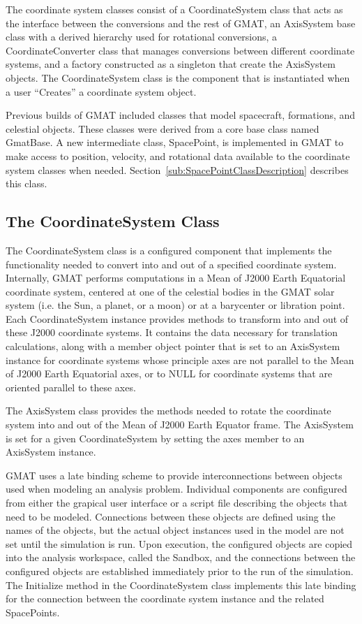 The coordinate system classes consist of a CoordinateSystem class that acts as the interface between
the conversions and the rest of GMAT, an AxisSystem base class with a derived hierarchy used for
rotational conversions, a CoordinateConverter class that manages conversions between different
coordinate systems, and a factory constructed as a singleton that create the AxisSystem objects. The
CoordinateSystem class is the component that is instantiated when a user {}``Creates'' a coordinate
system object.

Previous builds of GMAT included classes that model spacecraft, formations, and celestial objects.
These classes were derived from a core base class named GmatBase. A new intermediate class,
SpacePoint, is implemented in GMAT to make access to position, velocity, and rotational data
available to the coordinate system classes when needed. Section~\ref{sub:SpacePointClassDescription}
describes this class.


\subsection{The CoordinateSystem Class}

The CoordinateSystem class is a configured component that implements the functionality needed to
convert into and out of a specified coordinate system. Internally, GMAT performs computations in a
Mean of J2000 Earth Equatorial coordinate system, centered at one of the celestial bodies in the
GMAT solar system (i.e. the Sun, a planet, or a moon) or at a barycenter or libration point. Each
CoordinateSystem instance provides methods to transform into and out of these J2000 coordinate
systems. It contains the data necessary for translation calculations, along with a member object
pointer that is set to an AxisSystem instance for coordinate systems whose principle axes are not
parallel to the Mean of J2000 Earth Equatorial axes, or to NULL for coordinate systems that are
oriented parallel to these axes.

The AxisSystem class provides the methods needed to rotate the coordinate system into and out of the
Mean of J2000 Earth Equator frame.  The AxisSystem is set for a given CoordinateSystem by setting
the axes member to an AxisSystem instance.

GMAT uses a late binding scheme to provide interconnections between objects used when modeling an
analysis problem. Individual components are configured from either the grapical user interface or a
script file describing the objects that need to be modeled. Connections between these objects are
defined using the names of the objects, but the actual object instances used in the model are not
set until the simulation is run. Upon execution, the configured objects are copied into the analysis
workspace, called the Sandbox, and the connections between the configured objects are established
immediately prior to the run of the simulation. The Initialize method in the CoordinateSystem class
implements this late binding for the connection between the coordinate system instance and the
related SpacePoints.



